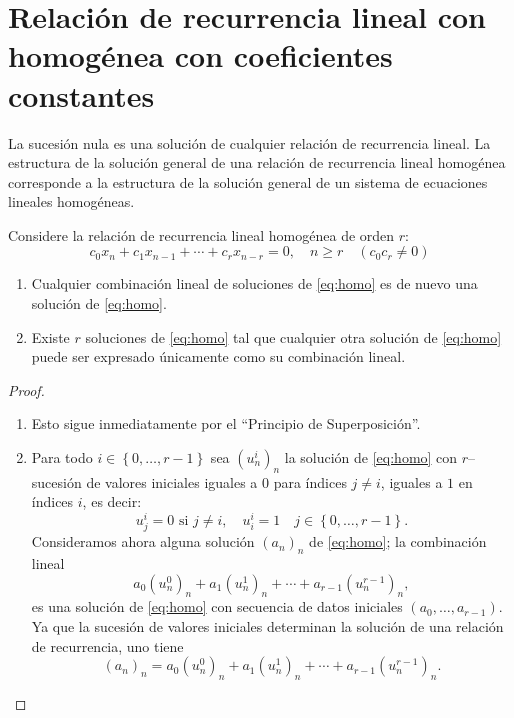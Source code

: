 \section{Relación de recurrencia lineal con homogénea con coeficientes constantes}

La sucesión nula es una solución de cualquier relación de recurrencia lineal. La estructura de la solución general de una relación de recurrencia lineal homogénea corresponde a la estructura de la solución general de un sistema de ecuaciones lineales homogéneas.
\begin{proposition}
	Considere la relación de recurrencia lineal homogénea de orden $r$:
	\begin{equation}\label{eq:homo}
	c_{0}x_{n}+c_{1}x_{n-1}+\cdots+c_{r}x_{n-r}=0,\quad n\geq r\quad\left(c_{0}c_{r}\neq0\right)
	\end{equation}
	\begin{enumerate}
		\item Cualquier combinación lineal de soluciones de \eqref{eq:homo} es de nuevo una solución de \eqref{eq:homo}.
		\item Existe $r$ soluciones de \eqref{eq:homo} tal que cualquier otra solución de \eqref{eq:homo} puede ser expresado únicamente como su combinación lineal.
	\end{enumerate}
\end{proposition}

\begin{proof}\leavevmode
	\begin{enumerate}
		\item Esto sigue inmediatamente por el ``Principio de Superposición''.
		\item Para todo $i\in\left\{0,\ldots,r-1 \right\}$ sea $\left(u^{i}_{n}\right)_{n}$ la solución de \eqref{eq:homo} con $r$--sucesión de valores iniciales iguales a $0$ para índices $j\neq i$, iguales a $1$ en índices $i$, es decir: \[ u^{i}_{j}=0\text{ si }j\neq i,\quad u^{i}_{i}=1\quad j\in\left\{0,\ldots,r-1 \right\}. \]
		Consideramos ahora alguna solución $(a_{n})_{n}$ de \eqref{eq:homo}; la combinación lineal \[ a_{0}{\left(u^{0}_{n}\right)}_{n}+a_{1}{\left(u^{1}_{n}\right)}_{n}+\cdots+a_{r-1}(u^{r-1}_{n})_{n}, \]	es una solución de \eqref{eq:homo} con secuencia de datos iniciales $\left(a_{0},\ldots,a_{r-1}\right)$. Ya que la sucesión de valores iniciales determinan la solución de una relación de recurrencia, uno tiene \[ {\left(a_{n}\right)}_{n}=a_{0}\left(u^{0}_{n}\right)_{n}+a_{1}\left(u^{1}_{n}\right)_{n}+\cdots+a_{r-1}\left(u^{r-1}_{n}\right)_{n}. \]
	\end{enumerate}
\end{proof}

